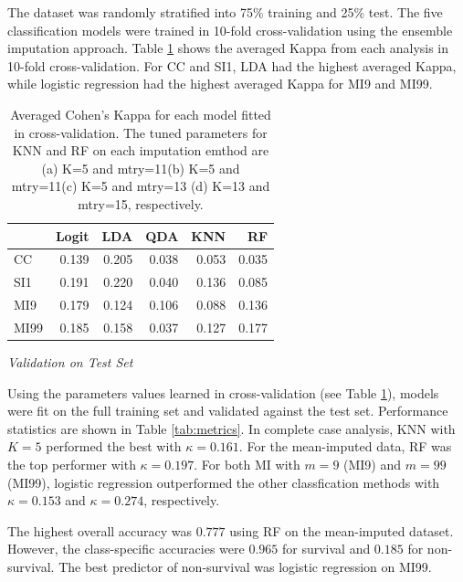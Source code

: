 \documentclass[12pt,]{article}
\begin{document}
The dataset was randomly stratified into 75\% training and 25\% test.
The five classification models were trained in 10-fold cross-validation
using the ensemble imputation approach. Table \ref{tab:cv-kappa} shows
the averaged Kappa from each analysis in 10-fold cross-validation. For
CC and SI1, LDA had the highest averaged Kappa, while logistic
regression had the highest averaged Kappa for MI9 and MI99.

\begin{table}[!h]

\caption{\label{tab:unnamed-chunk-5}\label{tab:cv-kappa} Averaged Cohen's Kappa for each model fitted in cross-validation.  The tuned parameters for KNN and RF on each imputation emthod are (a) K=5 and mtry=11(b) K=5 and mtry=11(c) K=5 and mtry=13 (d) K=13 and mtry=15, respectively.}
\centering
\fontsize{10}{12}\selectfont
\begin{tabular}{lrrrrr}
\toprule
  & Logit & LDA & QDA & KNN & RF\\
\midrule
CC & 0.139 & 0.205 & 0.038 & 0.053 & 0.035\\
SI1 & 0.191 & 0.220 & 0.040 & 0.136 & 0.085\\
MI9 & 0.179 & 0.124 & 0.106 & 0.088 & 0.136\\
MI99 & 0.185 & 0.158 & 0.037 & 0.127 & 0.177\\
\bottomrule
\end{tabular}
\end{table}

\emph{Validation on Test Set}

Using the parameters values learned in cross-validation (see Table
\ref{tab:cv-kappa}), models were fit on the full training set and
validated against the test set. Performance statistics are shown in
Table \ref{tab:metrics}. In complete case analysis, KNN with \(K=5\)
performed the best with \(\kappa=0.161\). For the mean-imputed data, RF
was the top performer with \(\kappa=0.197\). For both MI with \(m=9\)
(MI9) and \(m=99\) (MI99), logistic regression outperformed the other
classfication methods with \(\kappa=0.153\) and \(\kappa=0.274\),
respectively.

The highest overall accuracy was \(0.777\) using RF on the mean-imputed
dataset. However, the class-specific accuracies were \(0.965\) for
survival and \(0.185\) for non-survival. The best predictor of
non-survival was logistic regression on MI99.
\end{document}
